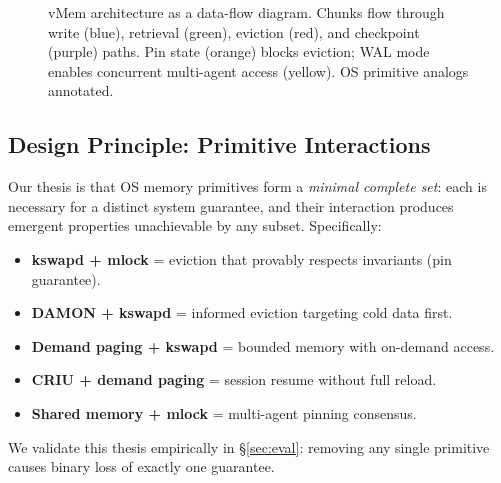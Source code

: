 \documentclass[10pt,twocolumn]{article}
\begin{document}
\begin{figure}[t]
\caption{vMem architecture as a data-flow diagram. Chunks flow through write (blue), retrieval (green), eviction (red), and checkpoint (purple) paths. Pin state (orange) blocks eviction; WAL mode enables concurrent multi-agent access (yellow). OS primitive analogs annotated.}
\label{fig:arch}
\end{figure}

\subsection{Design Principle: Primitive Interactions}

Our thesis is that OS memory primitives form a \emph{minimal complete set}: each is necessary for a distinct system guarantee, and their interaction produces emergent properties unachievable by any subset. Specifically:
\begin{itemize}[leftmargin=*,nosep]
  \item \textbf{kswapd + mlock} = eviction that provably respects invariants (pin guarantee).
  \item \textbf{DAMON + kswapd} = informed eviction targeting cold data first.
  \item \textbf{Demand paging + kswapd} = bounded memory with on-demand access.
  \item \textbf{CRIU + demand paging} = session resume without full reload.
  \item \textbf{Shared memory + mlock} = multi-agent pinning consensus.
\end{itemize}
We validate this thesis empirically in \S\ref{sec:eval}: removing any single primitive causes binary loss of exactly one guarantee.
\end{document}
